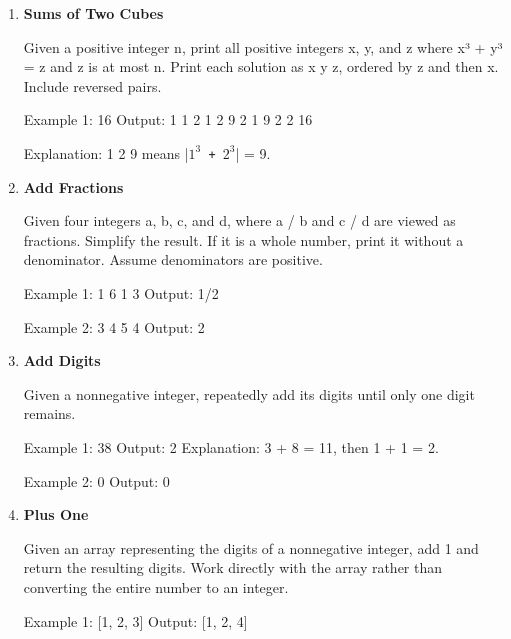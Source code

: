 \begin{enumerate}
\item \textbf{Sums of Two Cubes}

Given a positive integer n, print all positive integers x, y, and z where x³ + y³ = z and z is at most n. Print each solution as x y z, ordered by z and then x. Include reversed pairs.

\begin{console}[escapeinside=||]
Example 1: 16
Output:
1 1 2
1 2 9
2 1 9
2 2 16

Explanation: 1 2 9 means |\texttt{$1^3$ + $2^3$}| = 9.
\end{console}\newpage


\item \textbf{Add Fractions}

Given four integers a, b, c, and d, where a / b and c / d are viewed as fractions. Simplify the result. If it is a whole number, print it without a denominator. Assume denominators are positive.

\begin{console}
Example 1: 1 6 1 3
Output:    1/2

Example 2: 3 4 5 4
Output:    2
\end{console}\newpage


\item \textbf{Add Digits}

Given a nonnegative integer, repeatedly add its digits until only one digit remains.


\begin{console}
Example 1: 38
Output:    2
Explanation: 3 + 8 = 11, then 1 + 1 = 2.

Example 2: 0
Output:    0
\end{console}\newpage


\item \textbf{Plus One}

Given an array representing the digits of a nonnegative integer, add 1 and return the resulting digits. Work directly with the array rather than converting the entire number to an integer.

\begin{console}
Example 1: [1, 2, 3]
Output:    [1, 2, 4]


\end{console}
\end{enumerate}
